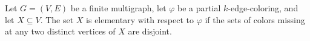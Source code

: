 \begin{definition}
Let $G=(V,E)$ be a finite multigraph, let $\varphi$ be a partial
$k$-edge-coloring, and let $X\subseteq V$.  The set $X$ is elementary with
respect to $\varphi$ if the sets of colors missing at any two distinct
vertices of $X$ are disjoint.
\end{definition}
